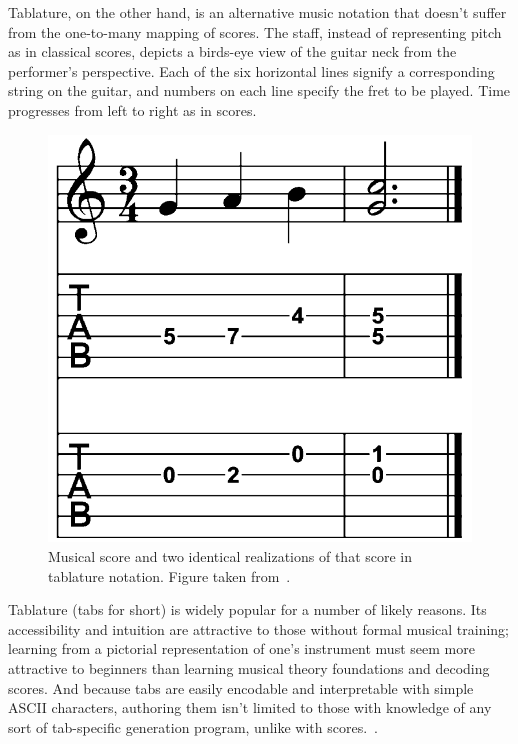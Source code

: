 \documentclass[12pt]{cmuthesis}
\begin{document}
Tablature, on the other hand, is an alternative music notation that doesn't suffer from the one-to-many mapping of scores. The staff, instead of representing pitch as in classical scores, depicts a birds-eye view of the guitar neck from the performer's perspective. Each of the six horizontal lines signify a corresponding string on the guitar, and numbers on each line specify the fret to be played. Time progresses from left to right as in scores. 

\begin{figure}[h] 
\label{fig:score-tabs}
\centering
\includegraphics[scale=0.8]{score-tabs}
\caption{Musical score and two identical realizations of that score in tablature notation. Figure taken from~\cite{barbanchoi2012}.}
\end{figure}

Tablature (tabs for short) is widely popular for a number of likely reasons. Its accessibility and intuition are attractive to those without formal musical training; learning from a pictorial representation of one's instrument must seem more attractive to beginners than learning musical theory foundations and decoding scores. And because tabs are easily encodable and interpretable with simple ASCII characters, authoring them isn't limited to those with knowledge of any sort of tab-specific generation program, unlike with scores.~\cite{macrae2010}.
\end{document}
